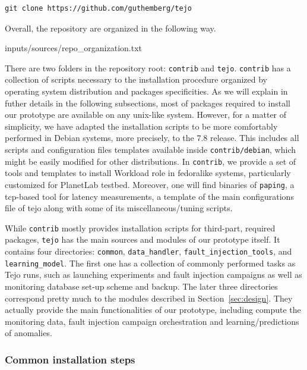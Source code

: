 \begin{lstlisting}
git clone https://github.com/guthemberg/tejo
\end{lstlisting}


Overall, the repository are organized in the following way.

  {inputs/sources/repo_organization.txt}

There are two folders in the repository root: \verb|contrib| and \verb|tejo|. \verb|contrib| has a collection of scripts necessary to the installation procedure organized by operating system distribution and packages specificities. As we will explain in futher details in the following subsections, most of packages required to install our prototype are available on any unix-like system. However, for a matter of simplicity, we have adapted the installation scripts to be more comfortably performed in Debian systems, more precisely, to the 7.8 release. This includes all scripts and configuration files templates available inside \verb|contrib/debian|, which might be easily modified for other distributions. In \verb|contrib|, we provide a set of tools and templates to install Workload role in fedoralike systems, particularly customized for PlanetLab testbed. Moreover, one will find binaries of \verb|paping|, a tcp-based tool for latency measurements, a template of the main configurations file of tejo along with some of its miscellaneous/tuning scripts.

While \verb|contrib|  mostly provides installation scripts for third-part, required packages, \verb|tejo| has the main sources and modules of our prototype itself. It contains four directories: \verb|common|, \verb|data_handler|, \verb|fault_injection_tools|, and \verb|learning_model|. The first one has a collection of commonly performed tasks as Tejo runs, such as launching experiments and fault injection campaigns as well as monitoring database set-up scheme and backup. The later three directories correspond pretty much to the modules described in Section~\ref{sec:design}. They actually provide the main functionalities of our prototype, including compute the monitoring data, fault injection campaign orchestration and learning/predictions of anomalies.

\subsubsection{Common installation steps}

